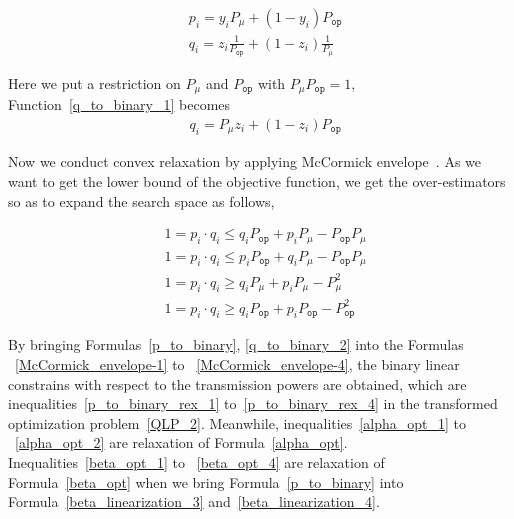 \documentclass[times]{ettauth}
\theoremstyle{mytheoremstyle}
\theoremstyle{mytheoremstyle}
\theoremstyle{mytheoremstyle}
\begin{document}
	\begin{align}
	& p_i = y_i P_\mu + (1-y_i) P_{\mathtt{op}}\label{p_to_binary}	\\
	& q_i = z_i \frac{1}{P_{\mathtt{op}}} + (1-z_i)\frac{1}{P_\mu}\label{q_to_binary_1}
   \end{align}

Here we put a restriction on $P_\mu$ and $P_{\mathtt{op}}$ with $P_\mu P_{\mathtt{op}} = 1$, Function~\ref{q_to_binary_1} becomes
	\begin{align}
	& q_i = P_\mu z_i  + (1-z_i) P_{\mathtt{op}} \label{q_to_binary_2}
   \end{align}
	
Now we conduct convex relaxation by applying McCormick envelope~\cite{Mitsos2009McCormickBasedRO}.
As we want to get the lower bound of the objective function, we get the over-estimators so as to expand the search space as follows,

	\begin{align}
& 1 = p_i \cdot q_i  \leq q_i P_{\mathtt{op}} + p_i P_\mu - P_{\mathtt{op}}P_\mu\label{McCormick_envelope-1}	\\
& 1= p_i \cdot q_i   \leq p_i P_{\mathtt{op}} + q_i P_\mu - P_{\mathtt{op}}P_\mu\label{McCormick_envelope-2}\\
& 1= p_i \cdot q_i   \geq 	q_i P_\mu + p_i P_\mu - P_\mu^2\label{McCormick_envelope-3}\\
& 1= p_i \cdot q_i   \geq 	q_i P_{\mathtt{op}} + p_i P_{\mathtt{op}} - P_{\mathtt{op}}^2\label{McCormick_envelope-4}
	\end{align}
	

	
	By bringing Formulas~\ref{p_to_binary}, \ref{q_to_binary_2} into the Formulas ~\ref{McCormick_envelope-1} to ~\ref{McCormick_envelope-4}, the binary linear constrains with respect to the transmission powers are obtained, which are inequalities~\ref{p_to_binary_rex_1} to~\ref{p_to_binary_rex_4} in the transformed optimization problem~\ref{QLP_2}.
Meanwhile, inequalities~\ref{alpha_opt_1} to ~\ref{alpha_opt_2} are relaxation of Formula~\ref{alpha_opt}.
Inequalities~\ref{beta_opt_1} to ~\ref{beta_opt_4} are relaxation of Formula~\ref{beta_opt} when we bring Formula~\ref{p_to_binary} into Formula~\ref{beta_linearization_3} and~\ref{beta_linearization_4}.
\end{document}
